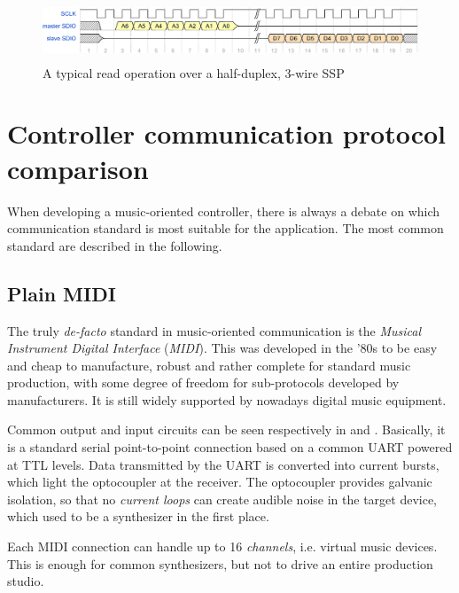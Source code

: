 \documentclass[a4paper,10pt]{article}
\begin{document}
\begin{multicols}{2}
\begin{figure}[t]
	\centering
	\includegraphics[keepaspectratio=true,height=1.8cm]{images/ssp_read.pdf}
	\caption{A typical read operation over a half-duplex, 3-wire SSP}
	\label{fig:ssp_read}
\end{figure}


\section{Controller communication protocol comparison}
\label{sec:controller_protocols}

When developing a music-oriented controller, there is always a debate on which
communication standard is most suitable for the application. The most common
standard are described in the following.


\subsection{Plain MIDI}

The truly \emph{de-facto} standard in music-oriented communication is the
\emph{Musical Instrument Digital Interface} (\emph{MIDI}). This was
developed in the '80s to be easy and cheap to manufacture, robust and rather
complete for standard music production, with some degree of freedom for
sub-protocols developed by manufacturers. It is still widely supported by
nowadays digital music equipment.

Common output and input circuits can be seen respectively in 
and . Basically, it is a standard serial point-to-point
connection based on a common UART powered at TTL levels. Data transmitted by
the UART is converted into current bursts, which light the optocoupler at the
receiver. The optocoupler provides galvanic isolation, so that no
\emph{current loops} can create audible noise in the target device, which used
to be a synthesizer in the first place.

Each MIDI connection can handle up to 16 \emph{channels}, i.e. virtual music
devices. This is enough for common synthesizers, but not to drive an entire
production studio.


\end{multicols}
\end{document}

